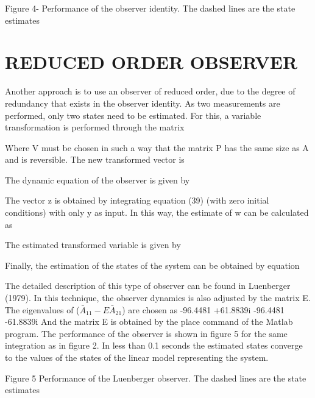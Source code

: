 \documentclass[sublist,a4paper,twoside,11pt]{article}
\begin{document}
Figure 4- Performance of the observer identity. The dashed lines are the state estimates


\section{REDUCED ORDER OBSERVER}
Another approach is to use an observer of reduced order, due to the degree of redundancy that exists in the observer identity. As two measurements are performed, only two states need to be estimated. For this, a variable transformation is performed through the matrix

Where V must be chosen in such a way that the matrix P has the same size as A and is reversible.
The new transformed vector is

The dynamic equation of the observer is given by

The vector z is obtained by integrating equation (39) (with zero initial conditions) with only y as input. In this way, the estimate of w can be calculated as 

The estimated transformed variable is given by

Finally, the estimation of the states of the system can be obtained by equation

The detailed description of this type of observer can be found in Luenberger (1979).
In this technique, the observer dynamics is also adjusted by the matrix E. The eigenvalues of ($\bar{A}_11-E \bar{A} _{21}$) are chosen as
-96.4481 +61.8839i
-96.4481 -61.8839i
And the matrix E is obtained by the place command of the Matlab program.
The performance of the observer is shown in figure 5 for the same integration as in figure 2. In less than 0.1 seconds the estimated states converge to the values of the states of the linear model representing the system. 



Figure 5 Performance of the Luenberger observer. The dashed lines are the state estimates





\end{document}
